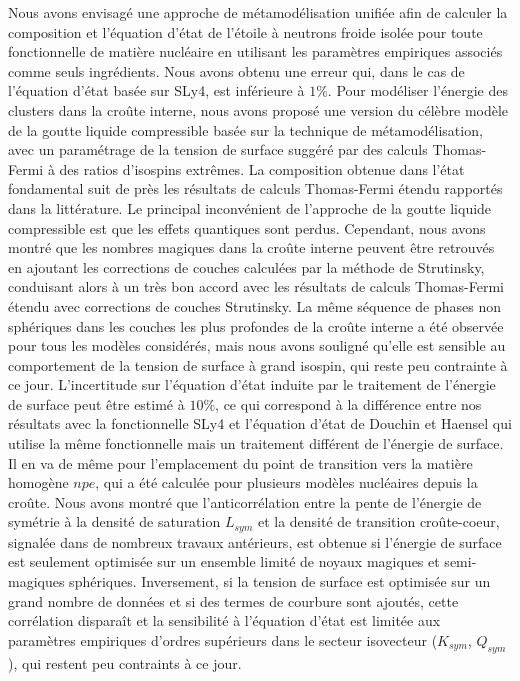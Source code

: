 Nous avons envisagé une approche de métamodélisation unifiée afin de 
calculer la composition et l'équation d'état de l'étoile à neutrons froide
isolée pour toute fonctionnelle de matière nucléaire en utilisant les 
paramètres empiriques associés comme seuls ingrédients. Nous avons obtenu une
erreur qui, dans le cas de l'équation d'état basée sur SLy4, est inférieure à 
$1\%$. 
Pour modéliser l'énergie des clusters dans la croûte interne, nous avons 
proposé une version du célèbre modèle de la goutte liquide compressible basée 
sur la technique de métamodélisation, avec un paramétrage de la tension de 
surface suggéré par des calculs Thomas-Fermi à des ratios d'isospins extrêmes. 
%
La composition obtenue dans l'état fondamental suit de près les résultats de 
calculs Thomas-Fermi étendu rapportés dans la littérature. Le principal 
inconvénient de l'approche de la goutte liquide compressible est que les effets 
quantiques sont perdus. Cependant, nous avons montré que les nombres magiques 
dans la croûte interne peuvent être retrouvés en ajoutant les corrections de 
couches calculées par la méthode de Strutinsky, conduisant alors à un très bon 
accord avec les résultats de calculs Thomas-Fermi étendu avec corrections de
couches Strutinsky. 
%
La même séquence de phases non sphériques dans les couches les plus profondes 
de la croûte interne a été observée pour tous les modèles considérés, mais nous 
avons souligné qu'elle est sensible au comportement de la tension de surface à 
grand isospin, qui reste peu contrainte à ce jour. 
%
L'incertitude sur l'équation d'état induite par le traitement de l'énergie de 
surface peut être estimé à $10\%$, ce qui correspond à la différence entre 
nos résultats avec la fonctionnelle SLy4 et l'équation d'état de Douchin et
Haensel qui utilise la même fonctionnelle mais un traitement différent de 
l'énergie de surface. 
Il en va de même pour l'emplacement du point de transition vers 
la matière homogène $npe$, qui a été calculée pour plusieurs modèles nucléaires
depuis la croûte. 
%
Nous avons montré que l'anticorrélation entre la pente de l'énergie de symétrie
à la densité de saturation $L_{sym}$ et la densité de transition croûte-coeur, 
signalée dans de nombreux travaux antérieurs, est obtenue si l'énergie de 
surface est seulement optimisée sur un ensemble limité de noyaux magiques et 
semi-magiques sphériques. Inversement, si la tension de surface est optimisée 
sur un grand nombre de données et si des termes de courbure sont ajoutés,
cette corrélation disparaît et la sensibilité à l'équation d'état est limitée
aux paramètres empiriques d'ordres supérieurs dans le secteur isovecteur
($K_{sym}$, $Q_{sym}$), qui restent peu contraints à ce jour.

